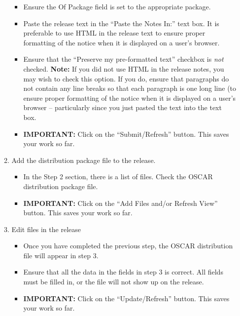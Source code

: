 \begin{enumerate}
\begin{enumerate}
\begin{itemize}
      \item Ensure the Of Package field is set to the appropriate
        package.
        
      \item Paste the release text in the ``Paste the Notes In:'' text
        box.  It is preferable to use HTML in the release text to
        ensure proper formatting of the notice when it is displayed on
        a user's browser.
        
      \item Ensure that the ``Preserve my pre-formatted text''
        checkbox is {\em not} checked.  {\bf Note:} If you did not use
        HTML in the release notes, you may wish to check this option.
        If you do, ensure that paragraphs do not contain any line
        breaks so that each paragraph is one long line (to ensure
        proper formatting of the notice when it is displayed on a
        user's browser -- particularly since you just pasted the text
        into the text box.

      \item {\bf IMPORTANT:} Click on the ``Submit/Refresh'' button.
        This saves your work so far.
      \end{itemize}

  \item Add the distribution package file to the release.

    \begin{itemize}
    \item In the Step 2 section, there is a list of files.  Check the
      OSCAR distribution package file.
      
    \item {\bf IMPORTANT:} Click on the ``Add Files and/or Refresh
      View'' button.  This saves your work so far.
    \end{itemize}

  \item Edit files in the release

    \begin{itemize}
    \item Once you have completed the previous step, the OSCAR
      distribution file will appear in step 3.

    \item Ensure that all the data in the fields in step 3 is
      correct.  All fields must be filled in, or the file will not
      show up on the release.
      
    \item {\bf IMPORTANT:} Click on the ``Update/Refresh'' button.
      This saves your work so far.
    \end{itemize}


\end{enumerate}
\end{enumerate}
